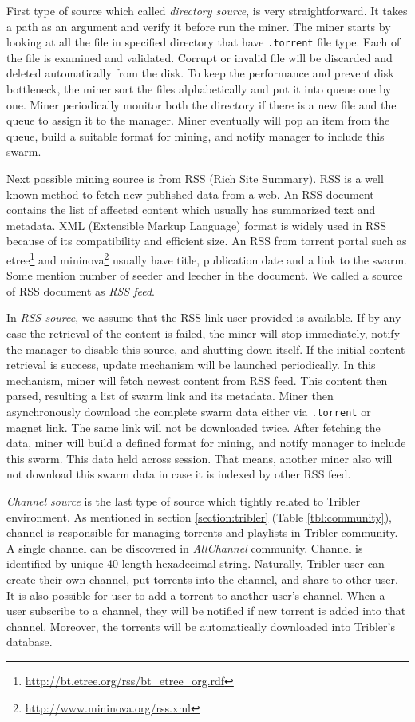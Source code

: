 First type of source which called \textit{directory source}, is very straightforward. It takes a path as an argument and verify it before run the miner. The miner starts by looking at all the file in specified directory that have \texttt{.torrent} file type. Each of the file is examined and validated. Corrupt or invalid file will be discarded and deleted automatically from the disk. To keep the performance and prevent disk bottleneck, the miner sort the files alphabetically and put it into queue one by one. Miner periodically monitor both the directory if there is a new file and the queue to assign it to the manager. Miner eventually will pop an item from the queue, build a suitable format for mining, and notify manager to include this swarm.

Next possible mining source is from RSS (Rich Site Summary). RSS is a well known method to fetch new published data from a web. An RSS document contains the list of affected content which usually has summarized text and metadata. XML (Extensible Markup Language) format is widely used in RSS because of its compatibility and efficient size. An RSS from torrent portal such as etree\footnote{\url{http://bt.etree.org/rss/bt_etree_org.rdf}} and mininova\footnote{\url{http://www.mininova.org/rss.xml}} usually have title, publication date and a link to the swarm. Some mention number of seeder and leecher in the document. We called a source of RSS document as \textit{RSS feed}. 

In \textit{RSS source}, we assume that the RSS link user provided is available. If by any case the retrieval of the content is failed, the miner will stop immediately, notify the manager to disable this source, and shutting down itself. If the initial content retrieval is success, update mechanism will be launched periodically. In this mechanism, miner will fetch newest content from RSS feed. This content then parsed, resulting a list of swarm link and its metadata. Miner then asynchronously download the complete swarm data either via \texttt{.torrent} or magnet link. The same link will not be downloaded twice. After fetching the data, miner will build a defined format for mining, and notify manager to include this swarm. This data held across session. That means, another miner also will not download this swarm data in case it is indexed by other RSS feed.

\textit{Channel source} is the last type of source which tightly related to Tribler environment. As mentioned in section \ref{section:tribler} (Table \ref{tbl:community}), channel is responsible for managing torrents and playlists in Tribler community. A single channel can be discovered in \textit{AllChannel} community. Channel is identified by unique 40-length hexadecimal string. Naturally, Tribler user can create their own channel, put torrents into the channel, and share to other user. It is also possible for user to add a torrent to another user's channel. When a user subscribe to a channel, they will be notified if new torrent is added into that channel. Moreover, the torrents will be automatically downloaded into Tribler's database.

